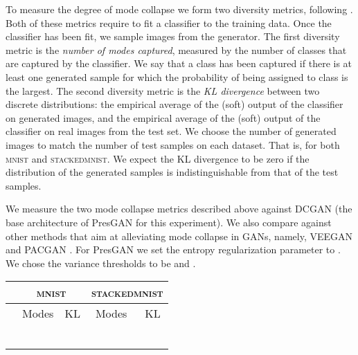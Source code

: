 \documentclass[11pt]{article}
\begin{document}
To measure the degree of mode collapse we form two diversity metrics, following \citet{srivastava2017veegan}. Both of these metrics require to fit a classifier to the training data. Once the classifier has been fit, we sample  images from the generator. The first diversity metric is the \emph{number of modes captured}, measured by the number of classes that are captured by the classifier. We say that a class  has been captured if there is at least one generated sample for which the probability of being assigned to class  is the largest. The second diversity metric is the \emph{\gls{KL} divergence} between two discrete distributions: the empirical average of the (soft) output of the classifier on generated images, and the empirical average of the (soft) output of the classifier on real images from the test set. We choose the number of generated images  to match the number of test samples on each dataset. That is,  for both \textsc{mnist} and \textsc{stackedmnist}. We expect the \gls{KL} divergence to be zero if the distribution of the generated samples is indistinguishable from that of the test samples. 

We measure the two mode collapse metrics described above against \gls{DCGAN} \citep{radford2015unsupervised} (the base architecture of Pres\gls{GAN} for this experiment). 
We also compare against other methods that aim at alleviating mode collapse in \glspl{GAN}, namely, \acrshort{VEEGAN} \citep{srivastava2017veegan} and \acrshort{PACGAN} \citep{lin2018pacgan}. 
For Pres\gls{GAN} we set the entropy regularization parameter  to . 
We chose the variance thresholds to be  and .

\begin{table*}[t]
	\centering
	\small
	\begin{tabular}{ccccc}
	\toprule
	   &  \multicolumn{2}{c}{\textsc{mnist}} &  \multicolumn{2}{c}{\textsc{stackedmnist}} \\
	 \midrule
	  & Modes & KL & Modes & KL \\
	 \hline
	 &  &  &  &  \\
	 &  &  & &  \\
	 &  &  & &  \\
	 &  &  &  &  \\
	 &  &  &  & \\
	 &  &  & &  \\
	\bottomrule
	\end{tabular}
	\label{tab:collapse_dim_bis}
\end{table*}
\end{document}
